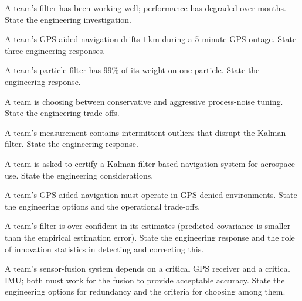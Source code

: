 \begin{exercise}
A team's filter has been working well; performance has degraded over months. State the engineering investigation.
\end{exercise}

\begin{exercise}
A team's GPS-aided navigation drifts $1\,\text{km}$ during a 5-minute GPS outage. State three engineering responses.
\end{exercise}

\begin{exercise}
A team's particle filter has $99\%$ of its weight on one particle. State the engineering response.
\end{exercise}

\begin{exercise}
A team is choosing between conservative and aggressive process-noise tuning. State the engineering trade-offs.
\end{exercise}

\begin{exercise}
A team's measurement contains intermittent outliers that disrupt the Kalman filter. State the engineering response.
\end{exercise}

\begin{exercise}
A team is asked to certify a Kalman-filter-based navigation system for aerospace use. State the engineering considerations.
\end{exercise}

\begin{exercise}
A team's GPS-aided navigation must operate in GPS-denied environments. State the engineering options and the operational trade-offs.
\end{exercise}

\begin{exercise}
A team's filter is over-confident in its estimates (predicted covariance is smaller than the empirical estimation error). State the engineering response and the role of innovation statistics in detecting and correcting this.
\end{exercise}

\begin{exercise}
A team's sensor-fusion system depends on a critical GPS receiver and a critical IMU; both must work for the fusion to provide acceptable accuracy. State the engineering options for redundancy and the criteria for choosing among them.
\end{exercise}

